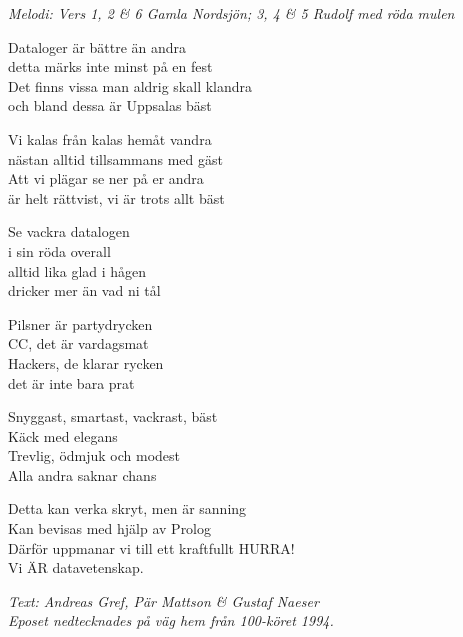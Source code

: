 {\footnotesize\textit{Melodi: Vers 1, 2 \& 6 Gamla Nordsjön; 3, 4 \& 5 Rudolf med röda mulen}}\par
\vspace{10pt}
Dataloger är bättre än andra\\
detta märks inte minst på en fest\\
Det finns vissa man aldrig skall klandra\\
och bland dessa är Uppsalas bäst\par
\vspace{10pt}
Vi kalas från kalas hemåt vandra\\
nästan alltid tillsammans med gäst\\
Att vi plägar se ner på er andra\\
är helt rättvist, vi är trots allt bäst\par
\newpage
Se vackra datalogen\\
i sin röda overall\\
alltid lika glad i hågen\\
dricker mer än vad ni tål\par
\vspace{10pt}
Pilsner är partydrycken\\
CC, det är vardagsmat\\
Hackers, de klarar rycken\\
det är inte bara prat\par
\vspace{10pt}
Snyggast, smartast, vackrast, bäst\\
Käck med elegans\\
Trevlig, ödmjuk och modest\\
Alla andra saknar chans\par
\vspace{10pt}
Detta kan verka skryt, men är sanning\\
Kan bevisas med hjälp av Prolog\\
Därför uppmanar vi till ett kraftfullt HURRA!\\
Vi ÄR datavetenskap.\par
\vspace{10pt}
{\footnotesize\textit{Text: Andreas Gref, Pär Mattson \& Gustaf Naeser\\
Eposet nedtecknades på väg hem från 100-köret 1994.}}
